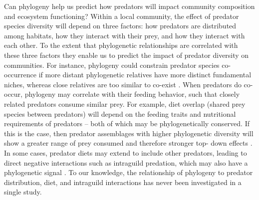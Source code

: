 \documentclass[11pt]{article}
\begin{document}
Can
phylogeny help us predict how predators will impact community composition and ecosystem functioning? Within a local community, the effect of predator species diversity will
depend on three factors: how predators are distributed among habitats,
how they interact with their prey, and how they interact with each other. To the extent that phylogenetic relationships are
correlated with these three factors they enable us to predict the impact
of predator diversity on communities. For instance, phylogeny could
constrain predator species co-occurrence if more distant phylogenetic
relatives have more distinct fundamental niches, whereas close relatives
are too similar to co-exist \citealt{Webb2002, Emerson2008}. When
predators do co-occur, phylogeny may correlate with their feeding
behavior, such that closely related predators consume similar prey. For
example, diet overlap (shared prey species between predators) will
depend on the feeding traits and nutritional requirements of predators
-- both of which may be phylogenetically conserved. If this is the case,
then predator assemblages with higher phylogenetic diversity will show a
greater range of prey consumed and therefore stronger top- down effects
\citealt{Finke2008a}. In some cases, predator diets may extend to include
other predators, leading to direct negative interactions such as
intraguild predation, which may also have a phylogenetic signal
\citealt{Pfennig2000}. To our knowledge, the relationship of phylogeny to
predator distribution, diet, and intraguild interactions has never been
investigated in a single study.
\end{document}
